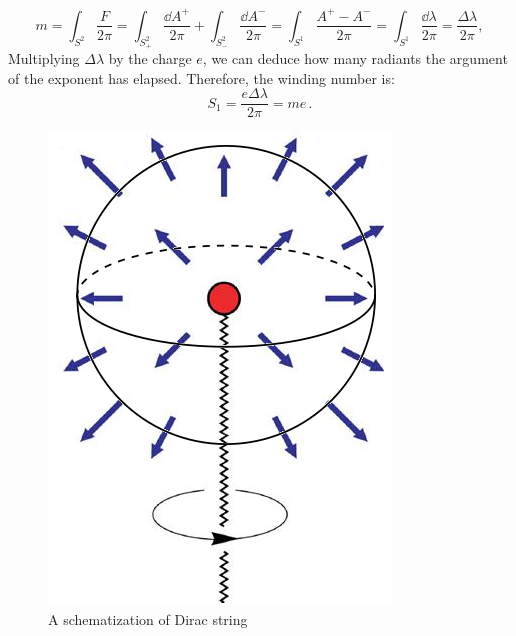 \documentclass[main.tex]{subfiles}
\begin{document}
\begin{equation}
m=\int_{S^2}\frac{F}{2\pi}=\int_{S^2_+}\frac{\dd{A}^+}{2\pi}+\int_{S^2_-}\frac{\dd{A}^-}{2\pi}=\int_{S^1}\frac{A^+-A^-}{2\pi}=\int_{S^1}\frac{\dd{\lambda}}{2\pi}=\frac{\Delta\lambda}{2\pi},
\end{equation}
%
Multiplying $\Delta \lambda$ by the charge $e$, we can deduce how many radiants the argument of the exponent has elapsed. Therefore, the winding number is: 
\begin{equation}
S_1=\frac{e\Delta\lambda}{2\pi}=me \,.
\end{equation}


\begin{figure}[h]
\centering
\includegraphics[scale=0.3]{DiracMon.png}
\caption{A schematization of Dirac string}
\label{fig-DirMon}
\end{figure}
\end{document}
